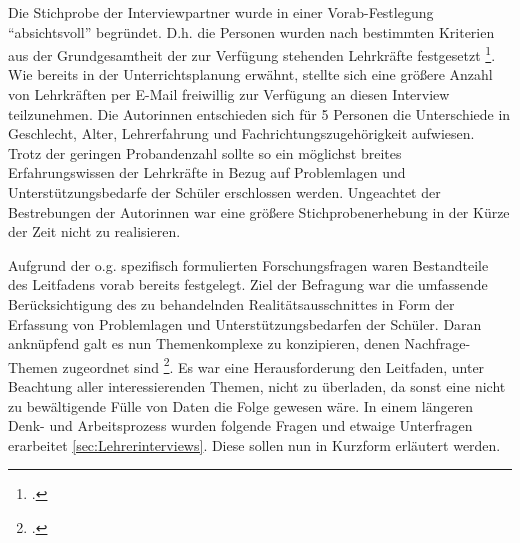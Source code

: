 Die Stichprobe der Interviewpartner wurde in einer Vorab-Festlegung "`absichtsvoll"' begründet. D.h. die Personen wurden nach bestimmten Kriterien aus der Grundgesamtheit der zur Verfügung stehenden Lehrkräfte festgesetzt \footcite[vgl.][39]{Mayer2013}. Wie bereits in der Unterrichtsplanung erwähnt, stellte sich eine größere Anzahl von Lehrkräften per E-Mail freiwillig zur Verfügung an diesen Interview teilzunehmen. Die Autorinnen entschieden sich für 5 Personen die Unterschiede in Geschlecht, Alter, Lehrerfahrung und Fachrichtungszugehörigkeit aufwiesen. Trotz der geringen Probandenzahl sollte so ein möglichst breites Erfahrungswissen der Lehrkräfte in Bezug auf Problemlagen und Unterstützungsbedarfe der Schüler erschlossen werden. Ungeachtet der Bestrebungen der Autorinnen war eine größere Stichprobenerhebung in der Kürze der Zeit nicht zu realisieren.

Aufgrund der o.g. spezifisch formulierten Forschungsfragen waren Bestandteile des Leitfadens vorab bereits festgelegt. Ziel der Befragung war die umfassende Berücksichtigung des zu behandelnden Realitätsausschnittes in Form der Erfassung von Problemlagen und Unterstützungsbedarfen der Schüler. Daran anknüpfend galt es nun Themenkomplexe zu konzipieren, denen Nachfrage-Themen zugeordnet sind \footcite[vgl.][45]{Mayer2013}. Es war eine Herausforderung den Leitfaden, unter Beachtung aller interessierenden Themen, nicht zu überladen, da sonst eine nicht zu bewältigende Fülle von Daten die Folge gewesen wäre. In einem längeren Denk- und Arbeitsprozess wurden folgende Fragen und etwaige Unterfragen erarbeitet \ref{sec:Lehrerinterviews}. Diese sollen nun in Kurzform erläutert werden.

